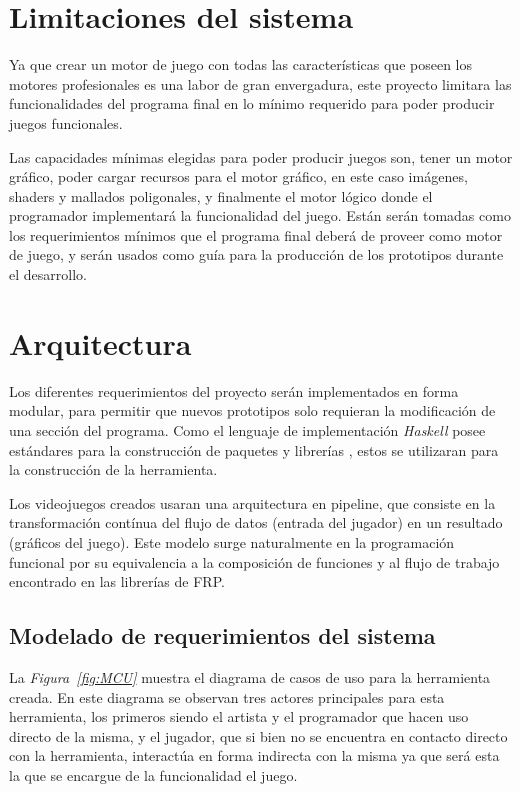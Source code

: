 \section{Limitaciones del sistema}

Ya que crear un motor de juego con todas las características que poseen los motores profesionales es una labor de gran envergadura, este proyecto limitara las funcionalidades del programa final en lo mínimo requerido para poder producir juegos funcionales.

Las capacidades mínimas elegidas para poder producir juegos son, tener un  motor gráfico, poder cargar recursos para el motor gráfico, en este caso imágenes, shaders y mallados poligonales, y finalmente el motor lógico donde el programador implementará la funcionalidad del juego. Están serán tomadas como los requerimientos  mínimos que el programa final deberá de proveer como motor de juego, y serán usados como guía para la producción de los prototipos durante el desarrollo.

\section{Arquitectura}

Los diferentes requerimientos del proyecto serán implementados en forma modular, para permitir que nuevos prototipos solo requieran la modificación de una sección del programa. Como el lenguaje de implementación \emph{Haskell} posee estándares para la construcción de paquetes y librerías \cite{wiki:WriteAHaskellProgram}, estos se utilizaran para la construcción de la herramienta.

Los videojuegos creados usaran una arquitectura en pipeline, que consiste en la transformación contínua del flujo de datos (entrada del jugador) en un resultado (gráficos del juego). Este modelo surge naturalmente en la programación funcional por su equivalencia a la composición de funciones y al flujo de trabajo encontrado en las librerías de FRP.

\subsection{Modelado de requerimientos del sistema}

La \emph{Figura~\ref{fig:MCU}} muestra el diagrama de casos de uso para la herramienta creada. En este diagrama se observan tres actores principales para esta herramienta, los primeros siendo el artista y el programador que hacen uso directo de la misma, y el jugador, que si bien no se encuentra en contacto directo con la herramienta, interactúa en forma indirecta con la misma ya que será esta la que se encargue de la funcionalidad el juego.

